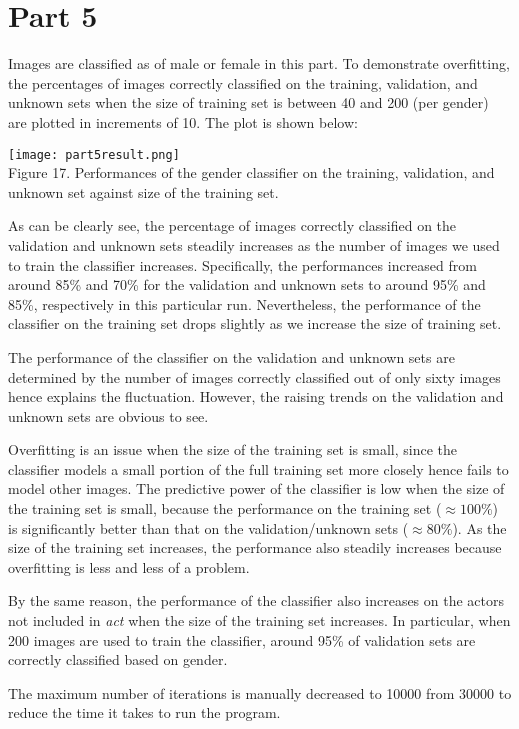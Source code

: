 \documentclass{article}
\begin{document}
\section*{Part 5}
Images are classified as of male or female in this part. To demonstrate overfitting, the percentages of images correctly classified on the training, validation, and unknown sets when the size of training set is between 40 and 200 (per gender) are plotted in increments of 10. The plot is shown below:
\begin{center}
\texttt{[image: part5result.png]}\\
Figure 17. Performances of the gender classifier on the training, validation, and unknown set against size of the training set.
\end{center}
As can be clearly see, the percentage of images correctly classified on the validation and unknown sets steadily increases as the number of images we used to train the classifier increases. Specifically, the performances increased from around 85\% and 70\% for the validation and unknown sets to around 95\% and 85\%, respectively in this particular run. Nevertheless, the performance of the classifier on the training set drops slightly as we increase the size of training set.
\par The performance of the classifier on the validation and unknown sets are determined by the number of images correctly classified out of only sixty images hence explains the fluctuation. However, the raising trends on the validation and unknown sets are obvious to see.
\par Overfitting is an issue when the size of the training set is small, since the classifier models a small portion of the  full training set more closely hence fails to model other images. The predictive power of the classifier is low when the size of the training set is small, because the performance on the training set ($\approx100\%$) is significantly better than that on the validation/unknown sets ($\approx80\%$).  As the size of the training set increases, the performance also steadily increases because overfitting is less and less of a problem.
\par By the same reason, the performance of the classifier also increases on the actors not included in \textit{act} when the size of the training set increases. In particular, when 200 images are used to train the classifier, around 95\% of validation sets are correctly classified based on gender. 
\par The maximum number of iterations is manually decreased to 10000 from 30000 to reduce the time it takes to run the program. 
\end{document}
